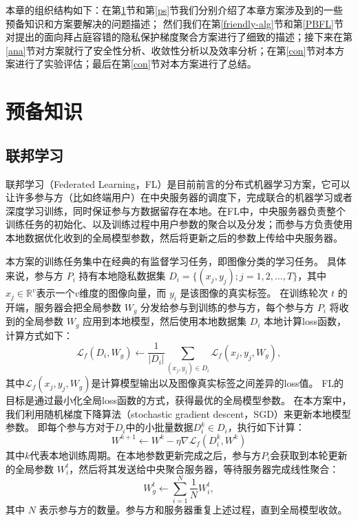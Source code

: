 本章的组织结构如下：在第\ref{bg}节和第\ref{ps}节我们分别介绍了本章方案涉及到的一些预备知识和方案要解决的问题描述；
然们我们在第\ref{friendly-alg}节和第\ref{PBFL}节对提出的面向拜占庭容错的隐私保护梯度聚合方案进行了细致的描述；接下来在第\ref{ana}节对方案就行了安全性分析、收敛性分析以及效率分析；在第\ref{con}节对本方案进行了实验评估；最后在第\ref{con}节对本方案进行了总结。

\section{预备知识}\label{bg}

\subsection{联邦学习}
联邦学习（Federated Learning，FL）是目前前言的分布式机器学习方案，它可以让许多参与方（比如终端用户）在中央服务器的调度下，完成联合的机器学习或者深度学习训练，同时保证参与方数据留存在本地。在FL中，中央服务器负责整个训练任务的初始化、以及训练过程中用户参数的聚合以及分发；而参与方负责使用本地数据优化收到的全局模型参数，然后将更新之后的参数上传给中央服务器。

本方案的训练任务集中在经典的有监督学习任务，即图像分类的学习任务。
具体来说，参与方 $P_i$ 持有本地隐私数据集 $D_i=\{(x_j, y_j);j=1,2,...,T\}$，其中$x_j\in\mathbb{R}^v$表示一个$v$维度的图像向量，而 $y_i$ 是该图像的真实标签。
在训练轮次 $t$ 的开端，服务器会把全局参数 $W_g$ 分发给参与到训练的参与方，每个参与方 $P_i$ 将收到的全局参数 $W_g$ 应用到本地模型，然后使用本地数据集 $D_i$ 本地计算loss函数，计算方式如下：
\begin{equation}
	\mathcal{L}_f(D_i, W_g) \leftarrow\frac{1}{|D_i|}\sum\limits_{(x_j,y_j)\in D_i}\mathcal{L}_f(x_j,y_j,W_g),
\end{equation}
其中$\mathcal{L}_f(x_j,y_j,W_g)$是计算模型输出以及图像真实标签之间差异的loss值。
FL的目标是通过最小化全局loss函数的方式，获得最优的全局模型参数。
在本方案中，我们利用随机梯度下降算法（stochastic gradient descent，SGD）来更新本地模型参数。
即每个参与方对于$D_i$中的小批量数据$D_i^k \in D_i$，执行如下计算：
\begin{equation}
	W^{k+1}\leftarrow W^{k}-\eta\nabla\mathcal{L}_f(D_i^k,W^k)
\end{equation}
其中$k$代表本地训练周期。在本地参数更新完成之后，参与方$P_i$会获取到本轮更新的全局参数 $W_i^t$，然后将其发送给中央聚合服务器，等待服务器完成线性聚合：
\begin{equation}
	W_g^{t}\leftarrow\sum_{i=1}^{N}\frac{1}{N}W_i^{t},
\end{equation}
其中 $N$ 表示参与方的数量。参与方和服务器重复上述过程，直到全局模型收敛。

